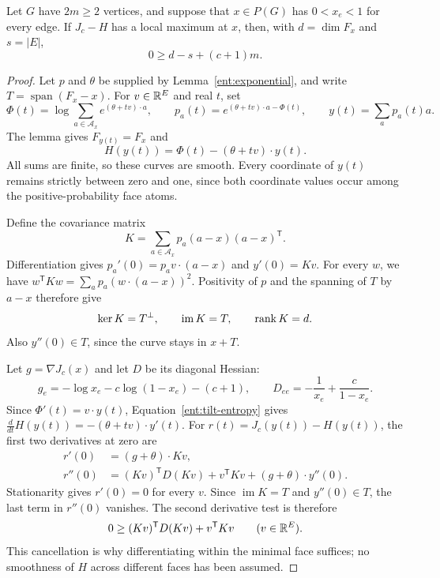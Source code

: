 \begin{lemma}\label{ent:trace}
Let $G$ have $2m\ge2$ vertices, and suppose that $x\in P(G)$ has
$0<x_e<1$ for every edge. If $J_c-H$ has a local maximum at $x$, then,
with $d=\dim F_x$ and $s=|E|$,
\begin{equation}\label{ent:trace-obstruction}
                         0\ge d-s+(c+1)m.
\end{equation}
\end{lemma}
\begin{proof}
Let $p$ and $\theta$ be supplied by Lemma~\ref{ent:exponential}, and
write $T=\operatorname{span}(F_x-x)$. For $v\in\mathbb R^E$ and real $t$, set
\[
 \Phi(t)=\log\sum_{a\in\mathcal A_x}e^{(\theta+tv)\cdot a},\qquad
 p_a(t)=e^{(\theta+tv)\cdot a-\Phi(t)},\qquad
 y(t)=\sum_a p_a(t)a.
\]
The lemma gives $F_{y(t)}=F_x$ and
\begin{equation}\label{ent:tilt-entropy}
              H(y(t))=\Phi(t)-(\theta+tv)\cdot y(t).
\end{equation}
All sums are finite, so these curves are smooth. Every coordinate of
$y(t)$ remains strictly between zero and one, since both coordinate
values occur among the positive-probability face atoms.

Define the covariance matrix
\[
 K=\sum_{a\in\mathcal A_x}p_a(a-x)(a-x)^{\mathsf T}.
\]
Differentiation gives $p_a'(0)=p_a v\cdot(a-x)$ and $y'(0)=Kv$.
For every $w$, we have
$w^{\mathsf T}Kw=\sum_a p_a(w\cdot(a-x))^2$.
Positivity of $p$ and the spanning of $T$ by $a-x$ therefore give
\begin{equation}\label{ent:covariance-range}
                 \ker K=T^\perp,\qquad \operatorname{im}K=T,
                 \qquad \operatorname{rank} K=d.
\end{equation}
Also $y''(0)\in T$, since the curve stays in $x+T$.

Let $g=\nabla J_c(x)$ and let $D$ be its diagonal Hessian:
\[
 g_e=-\log x_e-c\log(1-x_e)-(c+1),\qquad
 D_{ee}=-\frac1{x_e}+\frac{c}{1-x_e}.
\]
Since $\Phi'(t)=v\cdot y(t)$, Equation~\eqref{ent:tilt-entropy}
gives $\frac{d}{dt}H(y(t))=-(\theta+tv)\cdot y'(t)$.
For $r(t)=J_c(y(t))-H(y(t))$, the first two derivatives at zero are
\[
 \begin{aligned}
 r'(0)&=(g+\theta)\cdot Kv,\\
 r''(0)&=(Kv)^{\mathsf T}D(Kv)+v^{\mathsf T}Kv
                       +(g+\theta)\cdot y''(0).
 \end{aligned}
\]
Stationarity gives $r'(0)=0$ for every $v$. Since $\operatorname{im}K=T$
and $y''(0)\in T$, the last term in $r''(0)$ vanishes. The second
derivative test is therefore
\begin{equation}\label{ent:second-variation}
 0\ge (Kv)^{\mathsf T}D(Kv)+v^{\mathsf T}Kv
 \qquad(v\in\mathbb R^E).
\end{equation}
This cancellation is why differentiating within the minimal face suffices;
no smoothness of $H$ across different faces has been assumed.


\end{proof}
